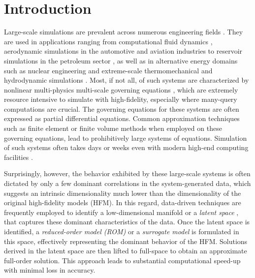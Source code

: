 \documentclass[11pt]{article}
\begin{document}
\section{Introduction}

Large-scale simulations \cite{AthanasiosAntoulasUnknown} are prevalent across numerous engineering fields \cite{benner2020model}.
They are used in applications ranging from computational fluid dynamics \cite{moin1998direct,germano1991a_dynamic,slotnick2014cfd,dowell2001modeling}, aerodynamic simulations in the automotive and aviation industries \cite{mehta2014large,ripepi2018reduced-order,Mavriplis_2007} to reservoir simulations in the petroleum sector \cite{Jenny2003multi,germano1991a_dynamic}, as well as in alternative energy domains such as nuclear engineering \cite{williamson2012multidimensional,gaston2015physics} and extreme-scale thermomechanical and hydrodynamic simulations \cite{jamshidiaval2021comprehensive,dambakizi2009multiscale,zhang2016thermo-mechanical,tasker2008a_hydrodynamic}.
Most, if not all, of such systems are characterized by nonlinear multi-physics multi-scale governing equations \cite{Guillot_2019,Huang_2017,kramer2016model}, which are extremely resource intensive to simulate with high-fidelity, especially where many-query computations are crucial.
The governing equations for these systems are often expressed as partial differential equations.
Common approximation techniques such as finite element \cite{zienkiewicz2005finite,nreddy2018introduction,jrhughes2000finite,hughes2012finite} or finite volume methods \cite{moukalled2016finite,versteeg_introduction_2007} when employed on these governing equations, lead to prohibitively large systems of equations.
Simulation of such systems often takes days or weeks even with modern high-end computing facilities \cite{farhat2014dimensional}.


Surprisingly, however, the behavior exhibited by these large-scale systems is often dictated by only a few dominant correlations in the system-generated data, which suggests an intrinsic dimensionality \cite{camastra2016intrinsic,kak2020intrinsic,verleysen1999forecasting,verveer1995evaluation} much lower than the dimensionality of the original high-fidelity models (HFM).
In this regard, data-driven techniques are frequently employed to identify a low-dimensional manifold or a \textit{latent space} \cite{Fries_2022,ghojogh2023elements}, that captures these dominant characteristics of the data.
Once the latent space is identified, a \textit{reduced-order model (ROM)} or a \textit{surrogate model} \cite{lucia2004reduced-order,moore2003principal,holmes1996turbulence,rowley2005model,kerschen2005the,hall2010proper,dowell2023reduced} %
is formulated in this space, effectively representing the dominant behavior of the HFM.
Solutions derived in the latent space are then lifted to full-space to obtain an approximate full-order solution.
This approach leads to substantial computational speed-up with minimal loss in accuracy.
\end{document}
